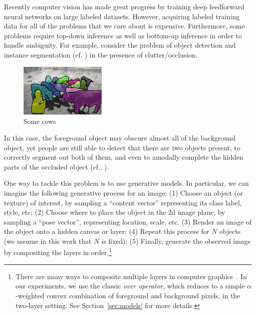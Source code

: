 

Recently computer vision has made great progress by training deep
feedforward neural networks on large labeled datasets.
However, acquiring labeled training data for all of the problems that
we care about is expensive.
Furthermore, some problems require top-down inference as well as
bottom-up inference in order to handle ambiguity.
For example, consider the problem of object detection
and instance segmentation (cf. \cite{Hariharan2014})  in the
presence of clutter/occlusion. 

\begin{figure}
\vspace{-4mm}
\begin{center}
    \includegraphics[width=0.375\textwidth]{figs/cows.pdf} \vspace{-2mm}
    \caption{\footnotesize Some cows}
    \label{fig:cows}
  \end{center}
  \vspace{-2mm}
\end{figure}
In this case, the foreground object may
obscure almost all of the background object, yet people are still able
to detect that there are two objects present, to correctly segment
out both of them, and even to amodally complete the hidden parts of
the occluded object (cf., \cite{Kar2015}).


One way to tackle this problem is to use generative models.
In particular, we can imagine the following generative process for an image:
(1) Choose an object (or texture) of interest, by sampling a ``content vector''
representing its class label, style, etc;
(2) Choose where to
place the object in the 2d image plane, by sampling a ``pose vector'',
representing location, scale, etc. 
(3) Render an image of the object onto a hidden canvas or layer;
(4) Repeat this process for $N$
objects (we assume in this work that $N$ is fixed);
(5) Finally, generate
the observed image by compositing the layers in order.\footnote{
%
There are many  ways to composite multiple layers in computer
graphics~\citep{porter1984compositing}. 
In our experiments, we use  the classic \emph{over operator}, which
reduces to a simple $\alpha$-weighted 
convex combination of foreground and background pixels,
in the two-layer setting.
 See Section~\ref{sec:models} for more details.
}

